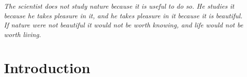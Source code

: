 \begin{savequote}[100mm]
    \itshape The scientist does not study nature because it is useful to do so. He studies it because he takes pleasure in it, and he takes pleasure in it because it is beautiful. If nature were not beautiful it would not be worth knowing, and life would not be worth living.
\end{savequote}

\chapter{Introduction}